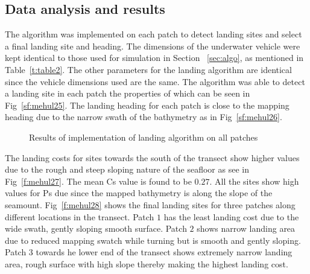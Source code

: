 	
\subsection{Data analysis and results}

The algorithm was implemented on each patch to detect landing sites and select a final landing site and heading. The dimensions of the underwater vehicle were kept identical to those used for simulation in Section ~\ref{sec:algo}, as mentioned in Table~\ref{t:table2}. The other parameters for the landing algorithm are identical since the vehicle dimensions used are the same. The algorithm was able to detect a landing site in each patch the properties of which can be seen in Fig~\ref{sf:mehul25}. The landing heading for each patch is close to the mapping heading due to the narrow swath of the bathymetry as in Fig~\ref{sf:mehul26}.

\begin{figure}[!ht]
\centering
{}\quad
{}
\caption{Results of implementation of landing algorithm on all patches}
\end{figure}

The landing costs for sites towards the south of the transect show higher values due to the rough and steep sloping nature of the seafloor as see in Fig~\ref{f:mehul27}. The mean Cs value is found to be $0.27$. All the sites show high values for Ps due since the mapped bathymetry is along the slope of the seamount. Fig~\ref{f:mehul28} shows the final landing sites for three patches along different locations in the transect. Patch $1$ has the least landing cost due to the wide swath, gently sloping smooth surface. Patch $2$ shows narrow landing area due to reduced mapping swatch while turning but is smooth and gently sloping. Patch $3$ towards he lower end of the transect shows extremely narrow landing area, rough surface with high slope thereby making the highest landing cost.

